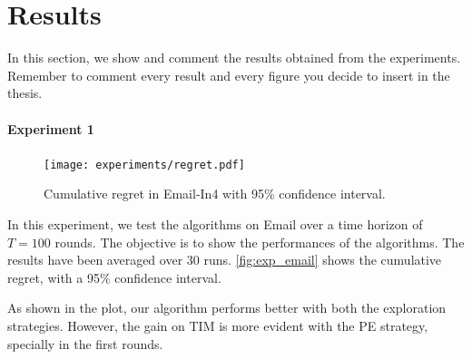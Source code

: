 \section{Results}

In this section, we show and comment the results obtained from the experiments. Remember to comment every result and every figure you decide to insert in the thesis.

\begin{example}
\paragraph{Experiment 1}

\begin{figure}[H]
  \centering
  \texttt{[image: experiments/regret.pdf]}
\caption{Cumulative regret in Email-In4 with 95\% confidence interval.}
\label{fig:exp_email}
\end{figure}

In this experiment, we test the algorithms on Email over a time horizon of $T=100$ rounds. The objective is to show the performances of the algorithms. The results have been averaged over 30 runs. \autoref{fig:exp_email} shows the cumulative regret, with a 95\% confidence interval.

As shown in the plot, our algorithm performs better with both the exploration strategies. However, the gain on TIM is more evident with the PE strategy, specially in the first rounds.
\end{example}
\fi
